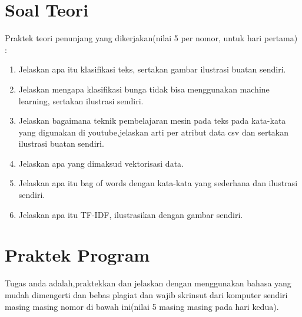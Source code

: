 \section{Soal Teori}
Praktek teori penunjang yang dikerjakan(nilai 5 per nomor, untuk hari pertama) :
\begin{enumerate}
	\item
	      Jelaskan apa itu klasifikasi teks, sertakan gambar ilustrasi buatan sendiri.
	\item
	      Jelaskan mengapa klasifikasi bunga tidak bisa menggunakan machine learning, sertakan ilustrasi sendiri.
	\item
	      Jelaskan bagaimana teknik pembelajaran mesin pada teks pada kata-kata yang digunakan di youtube,jelaskan arti per atribut data csv dan sertakan ilustrasi buatan sendiri.
	\item
	      Jelaskan apa yang dimaksud vektorisasi data.
	\item
	      Jelaskan apa itu bag of words dengan kata-kata yang sederhana dan ilustrasi sendiri.
	\item
	      Jelaskan apa itu TF-IDF, ilustrasikan dengan gambar sendiri.
\end{enumerate}



\section{Praktek Program}
Tugas anda adalah,praktekkan dan jelaskan dengan menggunakan bahasa yang mudah dimengerti dan bebas plagiat dan wajib skrinsut dari komputer sendiri masing masing nomor di bawah ini(nilai 5 masing masing pada hari kedua).

